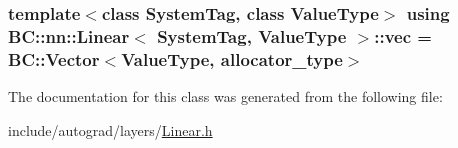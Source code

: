 \subsubsection[{\texorpdfstring{vec}{vec}}]{\setlength{\rightskip}{0pt plus 5cm}template$<$class System\+Tag, class Value\+Type$>$ using {\bf B\+C\+::nn\+::\+Linear}$<$ System\+Tag, Value\+Type $>$\+::{\bf vec} =  {\bf B\+C\+::\+Vector}$<$Value\+Type, {\bf allocator\+\_\+type}$>$}\hypertarget{classBC_1_1nn_1_1Linear_aa38b4edd892ccfb0ecfde08f5a5dfdb3}{}\label{classBC_1_1nn_1_1Linear_aa38b4edd892ccfb0ecfde08f5a5dfdb3}


The documentation for this class was generated from the following file\+:\begin{DoxyCompactItemize}
\item 
include/autograd/layers/\hyperlink{Linear_8h}{Linear.\+h}\end{DoxyCompactItemize}
